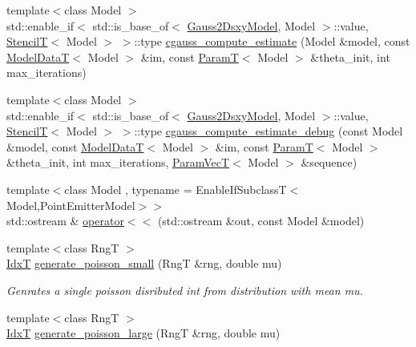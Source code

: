 \begin{DoxyCompactItemize}
\item 
{\footnotesize template$<$class Model $>$ }\\std\+::enable\+\_\+if$<$ std\+::is\+\_\+base\+\_\+of$<$ \hyperlink{classmappel_1_1Gauss2DsxyModel}{Gauss2\+Dsxy\+Model}, Model $>$\+::value, \hyperlink{namespacemappel_a3a06598240007876f8c4bf834ad86197}{StencilT}$<$ Model $>$ $>$\+::type \hyperlink{namespacemappel_acc653fb1d59f0403ed375c36e14dfa9a}{cgauss\+\_\+compute\+\_\+estimate} (Model \&model, const \hyperlink{namespacemappel_a97f050df953605381ae9c901c3b125f1}{Model\+DataT}$<$ Model $>$ \&im, const \hyperlink{namespacemappel_a667925cb0d6c0e49f2f035cc5a9a6857}{ParamT}$<$ Model $>$ \&theta\+\_\+init, int max\+\_\+iterations)
\item 
{\footnotesize template$<$class Model $>$ }\\std\+::enable\+\_\+if$<$ std\+::is\+\_\+base\+\_\+of$<$ \hyperlink{classmappel_1_1Gauss2DsxyModel}{Gauss2\+Dsxy\+Model}, Model $>$\+::value, \hyperlink{namespacemappel_a3a06598240007876f8c4bf834ad86197}{StencilT}$<$ Model $>$ $>$\+::type \hyperlink{namespacemappel_ac77df7c0889cc08a2937436d33691029}{cgauss\+\_\+compute\+\_\+estimate\+\_\+debug} (const Model \&model, const \hyperlink{namespacemappel_a97f050df953605381ae9c901c3b125f1}{Model\+DataT}$<$ Model $>$ \&im, const \hyperlink{namespacemappel_a667925cb0d6c0e49f2f035cc5a9a6857}{ParamT}$<$ Model $>$ \&theta\+\_\+init, int max\+\_\+iterations, \hyperlink{namespacemappel_a0f86d3153e4e27b095012f140eea58de}{Param\+VecT}$<$ Model $>$ \&sequence)
\item 
{\footnotesize template$<$class Model , typename  = Enable\+If\+Subclass\+T$<$\+Model,\+Point\+Emitter\+Model$>$$>$ }\\std\+::ostream \& \hyperlink{namespacemappel_a6e0c0a729adcdd75dcf8f7f504884fbb}{operator$<$$<$} (std\+::ostream \&out, const Model \&model)
\item 
{\footnotesize template$<$class RngT $>$ }\\\hyperlink{namespacemappel_ab17ec0f30b61ece292439d7ece81d3a8}{IdxT} \hyperlink{namespacemappel_af5deeb186fbcfbd0f449064cc70e8a86}{generate\+\_\+poisson\+\_\+small} (RngT \&rng, double mu)
\begin{DoxyCompactList}\small\item\em Genrates a single poisson disributed int from distribution with mean mu. \end{DoxyCompactList}\item 
{\footnotesize template$<$class RngT $>$ }\\\hyperlink{namespacemappel_ab17ec0f30b61ece292439d7ece81d3a8}{IdxT} \hyperlink{namespacemappel_ae776a0d92c466702788b7405a4a166e0}{generate\+\_\+poisson\+\_\+large} (RngT \&rng, double mu)

\end{DoxyCompactItemize}
